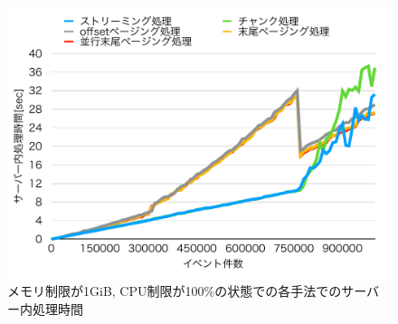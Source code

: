 \documentclass[../../../main]{subfiles}
\begin{document}
    \begin{figure}[H]
        \centering
        \includegraphics[width=12cm]{graph}
        \caption{メモリ制限が1GiB, CPU制限が100\%の状態での各手法でのサーバー内処理時間}
        \label{fig:server-time}
    \end{figure}
\end{document}
